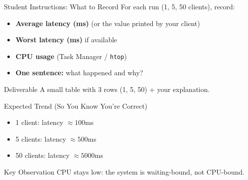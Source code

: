 \documentclass[11pt]{beamer}
\begin{document}
	\begin{frame}{Student Instructions: What to Record}
		For each run (1, 5, 50 clients), record:
		
		\begin{itemize}
			\item \textbf{Average latency (ms)} (or the value printed by your client)
			\item \textbf{Worst latency (ms)} if available
			\item \textbf{CPU usage} (Task Manager / \texttt{htop})
			\item \textbf{One sentence:} what happened and why?
		\end{itemize}
		

		\begin{block}{Deliverable}
			A small table with 3 rows (1, 5, 50) + your explanation.
		\end{block}
	\end{frame}
	
	\begin{frame}{Expected Trend (So You Know You're Correct)}
		\begin{itemize}
			\item 1 client: latency $\approx 100$ms
			\item 5 clients: latency $\approx 500$ms
			\item 50 clients: latency $\approx 5000$ms
		\end{itemize}
		

		\begin{alertblock}{Key Observation}
			CPU stays low: the system is waiting-bound, not CPU-bound.
		\end{alertblock}
	\end{frame}
	
\end{document}
